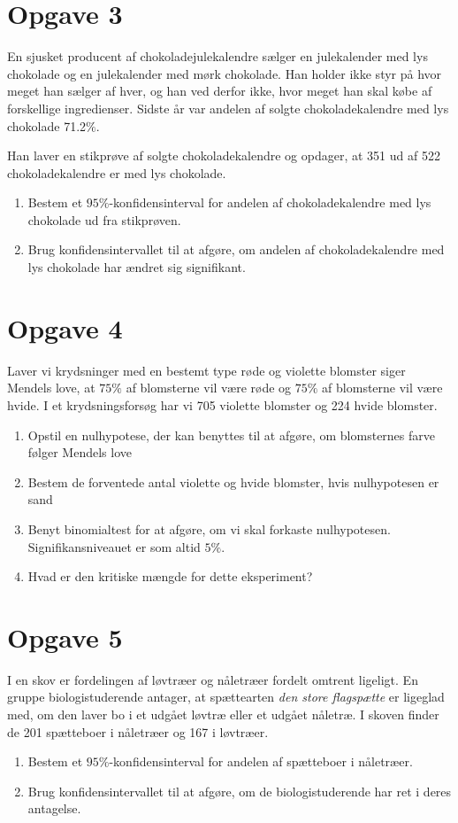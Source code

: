 \section*{Opgave 3}
En sjusket producent af chokoladejulekalendre sælger en julekalender med lys chokolade og en julekalender med mørk chokolade. Han holder ikke styr på hvor meget han sælger af hver, og han ved derfor
ikke, hvor meget han skal købe af forskellige ingredienser. Sidste år var andelen af solgte chokoladekalendre med lys chokolade 71.2$\%$. 

Han laver en stikprøve af solgte chokoladekalendre og opdager, at 351 ud af 522 chokoladekalendre er med lys chokolade.
\begin{enumerate}[label=\roman*)]
	\item Bestem et $95\%$-konfidensinterval for andelen af chokoladekalendre med lys chokolade ud fra stikprøven.
	\item Brug konfidensintervallet til at afgøre, om andelen af chokoladekalendre med lys chokolade har ændret sig signifikant. 
\end{enumerate}


\section*{Opgave 4}
Laver vi krydsninger med en bestemt type røde og violette blomster siger Mendels love, at $75\%$ af blomsterne vil være røde og $75\%$ af blomsterne vil være hvide. I et krydsningsforsøg har vi 705 violette blomster og 224 hvide blomster. 
\begin{enumerate}[label=\roman*)]
\item Opstil en nulhypotese, der kan benyttes til at afgøre, om blomsternes farve følger Mendels love
\item Bestem de forventede antal violette og hvide blomster, hvis nulhypotesen er sand
\item Benyt binomialtest for at afgøre, om vi skal forkaste nulhypotesen. Signifikansniveauet er som altid $5\%$.
\item Hvad er den kritiske mængde for dette eksperiment?
\end{enumerate}

\section*{Opgave 5}
I en skov er fordelingen af løvtræer og nåletræer fordelt omtrent ligeligt. En gruppe biologistuderende antager, at spættearten \textit{den store flagspætte} er ligeglad med, om den laver bo i et udgået løvtræ eller et udgået nåletræ. I skoven finder de 201 spætteboer i nåletræer og 167 i løvtræer. 
\begin{enumerate}[label=\roman*)]
\item Bestem et $95\%$-konfidensinterval for andelen af spætteboer i nåletræer.
\item Brug konfidensintervallet til at afgøre, om de biologistuderende har ret i deres antagelse.

\end{enumerate}

